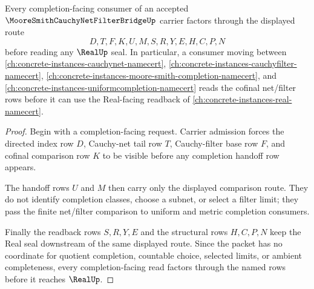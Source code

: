 \begin{theorem}
\label{thm:moore-smith-cauchy-net-filter-bridge-handoff}
Every completion-facing consumer of an accepted $\MooreSmithCauchyNetFilterBridgeUp$ carrier factors through the displayed route
$$
D,T,F,K,U,M,S,R,Y,E,H,C,P,N
$$
before reading any $\RealUp$ seal. In particular, a consumer moving between \autoref{ch:concrete-instances-cauchynet-namecert}, \autoref{ch:concrete-instances-cauchyfilter-namecert}, \autoref{ch:concrete-instances-moore-smith-completion-namecert}, and \autoref{ch:concrete-instances-uniformcompletion-namecert} reads the cofinal net/filter rows before it can use the Real-facing readback of \autoref{ch:concrete-instances-real-namecert}.
\end{theorem}
\begin{proof}
Begin with a completion-facing request. Carrier admission forces the directed index row $D$, Cauchy-net tail row $T$, Cauchy-filter base row $F$, and cofinal comparison row $K$ to be visible before any completion handoff row appears.

The handoff rows $U$ and $M$ then carry only the displayed comparison route. They do not identify completion classes, choose a subnet, or select a filter limit; they pass the finite net/filter comparison to uniform and metric completion consumers.

Finally the readback rows $S,R,Y,E$ and the structural rows $H,C,P,N$ keep the Real seal downstream of the same displayed route. Since the packet has no coordinate for quotient completion, countable choice, selected limits, or ambient completeness, every completion-facing read factors through the named rows before it reaches $\RealUp$.
\end{proof}


\begin{closurestatus}{\MooreSmithCauchyNetFilterBridgeUp}
  \theoryclosure{\seedClosure}
  \formalstatus{\unformalizedV}
\end{closurestatus}
